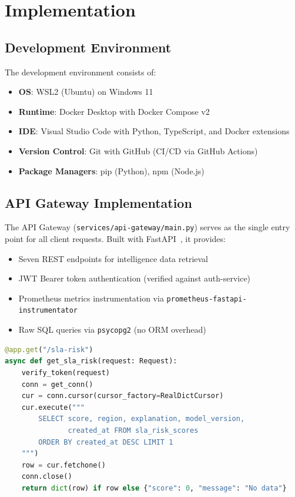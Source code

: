 \chapter{Implementation}
\label{ch:implementation}

\section{Development Environment}

The development environment consists of:
\begin{itemize}
    \item \textbf{OS}: WSL2 (Ubuntu) on Windows 11
    \item \textbf{Runtime}: Docker Desktop with Docker Compose v2
    \item \textbf{IDE}: Visual Studio Code with Python, TypeScript, and Docker extensions
    \item \textbf{Version Control}: Git with GitHub (CI/CD via GitHub Actions)
    \item \textbf{Package Managers}: pip (Python), npm (Node.js)
\end{itemize}

\section{API Gateway Implementation}

The API Gateway (\texttt{services/api-gateway/main.py}) serves as the single entry point for all client requests. Built with FastAPI~\cite{fastapi2023}, it provides:

\begin{itemize}
    \item Seven REST endpoints for intelligence data retrieval
    \item JWT Bearer token authentication (verified against auth-service)
    \item Prometheus metrics instrumentation via \texttt{prometheus-fastapi-instrumentator}
    \item Raw SQL queries via \texttt{psycopg2} (no ORM overhead)
\end{itemize}

\begin{lstlisting}[language=Python, caption={API Gateway endpoint example}]
@app.get("/sla-risk")
async def get_sla_risk(request: Request):
    verify_token(request)
    conn = get_conn()
    cur = conn.cursor(cursor_factory=RealDictCursor)
    cur.execute("""
        SELECT score, region, explanation, model_version,
               created_at FROM sla_risk_scores
        ORDER BY created_at DESC LIMIT 1
    """)
    row = cur.fetchone()
    conn.close()
    return dict(row) if row else {"score": 0, "message": "No data"}
\end{lstlisting}

